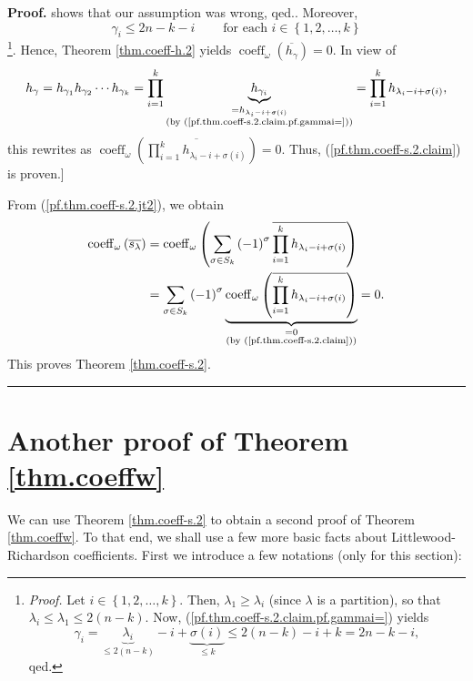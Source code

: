 \documentclass[numbers=enddot,12pt,final,onecolumn,notitlepage]{scrartcl}%
\theoremstyle{definition}
\newenvironment{proof}[1][Proof]{\noindent\textbf{#1.} }{\ \rule{0.5em}{0.5em}}
\let\sumnonlimits\sum
\let\prodnonlimits\prod
\renewcommand{\sum}{\sumnonlimits\limits}
\renewcommand{\prod}{\prodnonlimits\limits}
\begin{document}
\begin{proof}
{shows that our assumption was wrong, qed.}. Moreover,%
\[
\gamma_{i}\leq2n-k-i\ \ \ \ \ \ \ \ \ \ \text{for each }i\in\left\{
1,2,\ldots,k\right\}
\]
\footnote{\textit{Proof.} Let $i\in\left\{  1,2,\ldots,k\right\}  $. Then,
$\lambda_{1}\geq\lambda_{i}$ (since $\lambda$ is a partition), so that
$\lambda_{i}\leq\lambda_{1}\leq2\left(  n-k\right)  $. Now,
(\ref{pf.thm.coeff-s.2.claim.pf.gammai=}) yields%
\[
\gamma_{i}=\underbrace{\lambda_{i}}_{\leq2\left(  n-k\right)  }%
-i+\underbrace{\sigma\left(  i\right)  }_{\leq k}\leq2\left(  n-k\right)
-i+k=2n-k-i,
\]
qed.}. Hence, Theorem \ref{thm.coeff-h.2} yields $\operatorname*{coeff}%
\nolimits_{\omega}\left(  \overline{h_{\gamma}}\right)  =0$. In view of%
\[
h_{\gamma}=h_{\gamma_{1}}h_{\gamma_{2}}\cdots h_{\gamma_{k}}=\prod_{i=1}%
^{k}\underbrace{h_{\gamma_{i}}}_{\substack{=h_{\lambda_{i}-i+\sigma\left(
i\right)  }\\\text{(by (\ref{pf.thm.coeff-s.2.claim.pf.gammai=}))}}%
}=\prod_{i=1}^{k}h_{\lambda_{i}-i+\sigma\left(  i\right)  },
\]
this rewrites as $\operatorname*{coeff}\nolimits_{\omega}\left(
\overline{\prod_{i=1}^{k}h_{\lambda_{i}-i+\sigma\left(  i\right)  }}\right)
=0$. Thus, (\ref{pf.thm.coeff-s.2.claim}) is proven.]

From (\ref{pf.thm.coeff-s.2.jt2}), we obtain%
\begin{align*}
\operatorname*{coeff}\nolimits_{\omega}\left(  \overline{s_{\lambda}}\right)
&  =\operatorname*{coeff}\nolimits_{\omega}\left(  \sum_{\sigma\in S_{k}%
}\left(  -1\right)  ^{\sigma}\overline{\prod_{i=1}^{k}h_{\lambda_{i}%
-i+\sigma\left(  i\right)  }}\right) \\
&  =\sum_{\sigma\in S_{k}}\left(  -1\right)  ^{\sigma}%
\underbrace{\operatorname*{coeff}\nolimits_{\omega}\left(  \overline
{\prod_{i=1}^{k}h_{\lambda_{i}-i+\sigma\left(  i\right)  }}\right)
}_{\substack{=0\\\text{(by (\ref{pf.thm.coeff-s.2.claim}))}}}=0.
\end{align*}
This proves Theorem \ref{thm.coeff-s.2}.
\end{proof}

\section{\label{sect.redh-another-proof}Another proof of Theorem
\ref{thm.coeffw}}

We can use Theorem \ref{thm.coeff-s.2} to obtain a second proof of Theorem
\ref{thm.coeffw}. To that end, we shall use a few more basic facts about
Littlewood-Richardson coefficients. First we introduce a few notations (only
for this section):
\end{document}
